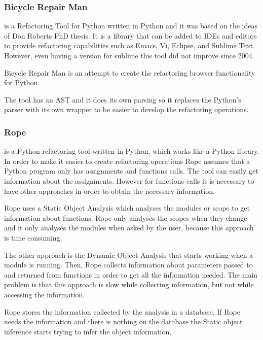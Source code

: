 \subsubsection{Bicycle Repair Man}

 is a Refactoring Tool for Python written in Python and it was based on the ideas of Don Roberts PhD thesis. 
 It is a library that can be added to IDEs and editors to provide refactoring capabilities such as Emacs, Vi, Eclipse, and Sublime Text. 
 However, even having a version for sublime this tool did not improve since 2004.

Bicycle Repair Man is an attempt to create the refactoring browser functionality for Python. 

The tool has an AST and it does its own parsing so it replaces the Python's parser with its own wrapper to be easier to develop the refactoring operations.


\subsubsection{Rope}

 is a Python refactoring tool written in Python, which works like a Python library.
In order to make it easier to create refactoring operations Rope assumes that a Python program only has assignments and functions calls. %
The tool can easily get information about the assignments. 
However for functions calls it is necessary to have other approaches in order to obtain the necessary information. 

Rope uses a Static Object Analysis which analyses the modules or scope to get information about functions. 
Rope only analyses the scopes when they change and it only analyses the modules when asked by the user, because this approach is time consuming. 

The other approach is the Dynamic Object Analysis that starts working when a module is running. 
Then, Rope collects information about parameters passed to and returned from functions in order to get all the information needed. 
The main problem is that this approach is slow while collecting information, but not while accessing the information.

Rope stores the information collected by the analysis in a database. 
If Rope needs the information and there is nothing on the database the Static object inference starts trying to infer the object information.

